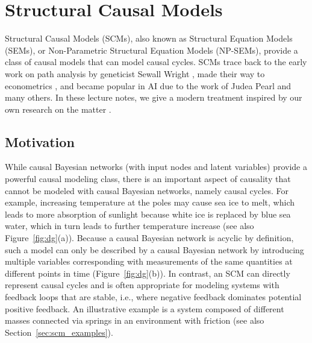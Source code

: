 \section{Structural Causal Models}

Structural Causal Models (SCMs), also known as Structural Equation Models (SEMs), or Non-Parametric Structural Equation Models (NP-SEMs), provide a class of causal models that can model causal cycles. 
SCMs trace back to the early work on path analysis by geneticist Sewall Wright \cite{Wri21}, made their way to econometrics \cite{Haa43,StrotzWold1960}, and became popular in AI due to the work of Judea Pearl \cite{Pearl09} and many others.
In these lecture notes, we give a modern treatment inspired by our own research on the matter \cite{BFPM21,FM20}.

\subsection{Motivation}

While causal Bayesian networks (with input nodes and latent variables) provide a powerful causal modeling class, there is an important aspect of causality that cannot be modeled with causal Bayesian networks, namely causal cycles.
For example, increasing temperature at the poles may cause sea ice to melt, which leads to more absorption of sunlight because white ice is replaced by blue sea water, which in turn leads to further temperature increase (see also Figure~\ref{fig:dg}(a)).
Because a causal Bayesian network is acyclic by definition, such a model can only be described by a causal Bayesian network by introducing multiple variables corresponding with measurements of the same quantities at different points in time (Figure~\ref{fig:dg}(b)).
In contrast, an SCM can directly represent causal cycles and is often appropriate for modeling systems with feedback loops that are stable, i.e., where negative feedback dominates potential positive feedback. 
An illustrative example is a system composed of different masses connected via springs in an environment with friction (see also Section~\ref{sec:scm_examples}).

